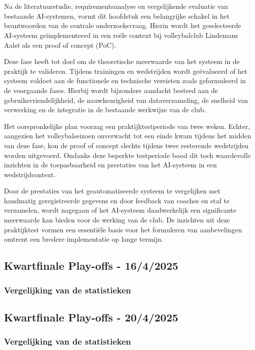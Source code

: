 \chapter{}
\label{ch:poc}
Na de literatuurstudie, requirementsanalyse en vergelijkende evaluatie van bestaande AI-systemen, vormt dit hoofdstuk een belangrijke schakel in het beantwoorden van de centrale onderzoeksvraag. Hierin wordt het geselecteerde AI-systeem geïmplementeerd in een reële context bij volleybalclub Lindemans Aalst als een proof of concept (PoC).

Deze fase heeft tot doel om de theoretische meerwaarde van het systeem in de praktijk te valideren. Tijdens trainingen en wedstrijden wordt geëvalueerd of het systeem voldoet aan de functionele en technische vereisten zoals geformuleerd in de voorgaande fases. Hierbij wordt bijzondere aandacht besteed aan de gebruiksvriendelijkheid, de nauwkeurigheid van dataverzameling, de snelheid van verwerking en de integratie in de bestaande werkwijze van de club.

Het oorspronkelijke plan voorzag een praktijktestperiode van twee weken. Echter, aangezien het volleybalseizoen onverwacht tot een einde kwam tijdens het midden van deze fase, kon de proof of concept slechts tijdens twee resterende wedstrijden worden uitgevoerd. Ondanks deze beperkte testperiode bood dit toch waardevolle inzichten in de toepasbaarheid en prestaties van het AI-systeem in een wedstrijdcontext.

Door de prestaties van het geautomatiseerde systeem te vergelijken met handmatig geregistreerde gegevens en door feedback van coaches en staf te verzamelen, wordt nagegaan of het AI-systeem daadwerkelijk een significante meerwaarde kan bieden voor de werking van de club. De inzichten uit deze praktijktest vormen een essentiële basis voor het formuleren van aanbevelingen omtrent een bredere implementatie op lange termijn.

\section{Kwartfinale Play-offs - 16/4/2025}
\subsection{Vergelijking van de statistieken}





\section{Kwartfinale Play-offs - 20/4/2025}
\subsection{Vergelijking van de statistieken}



